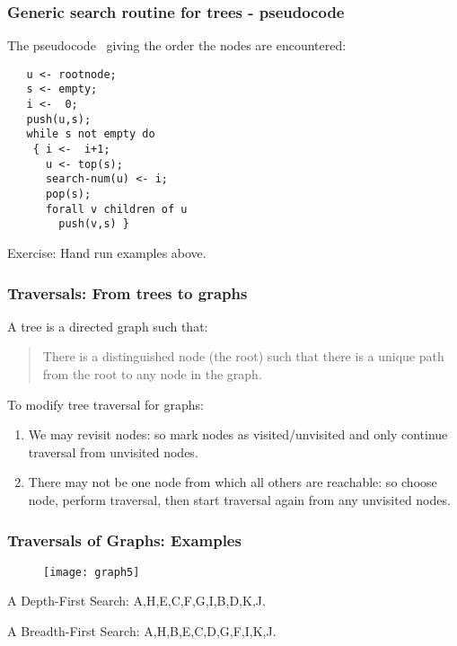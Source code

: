   \begin{frame}[fragile]
\frametitle{Generic search routine for trees - pseudocode}

The pseudocode \color{blue}{labels each node u with search-num(u)}\ giving the order the nodes are encountered:

\begin{verbatim}
   u <- rootnode;
   s <- empty;
   i <-  0;
   push(u,s);
   while s not empty do
    { i <-  i+1;
      u <- top(s);
      search-num(u) <- i;
      pop(s);
      forall v children of u
        push(v,s) }
\end{verbatim}

Exercise: Hand run examples above.
\end{frame}

  \begin{frame}[fragile]
\frametitle{Traversals: From trees to graphs}

A tree is a directed graph such that:
\begin{quote}\color{blue}
There is a distinguished node (the root) such that there is a unique path from the root to any node in the graph.
\color{black}\end{quote}

To modify tree traversal for graphs:
\begin{enumerate}
\item We may revisit nodes: so mark nodes as visited/unvisited and only continue traversal from unvisited nodes.
\item There may not be one node from which all others are reachable: so choose node, perform traversal, then start traversal again from any unvisited nodes.
\end{enumerate}
\end{frame}


  \begin{frame}[fragile]
\frametitle{Traversals of Graphs: Examples}


    \begin{figure} [ht]
    \centering
    \texttt{[image: graph5]}
    \end{figure}

A Depth-First Search: \color{blue}A,H,E,C,F,G,I,B,D,K,J.\color{black}

A Breadth-First Search: \color{blue}A,H,B,E,C,D,G,F,I,K,J.\color{black}
\end{frame}

